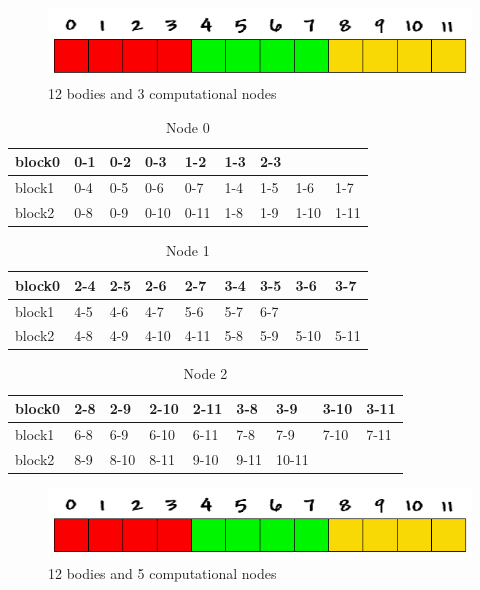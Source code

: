 \documentclass[a4paper]{article}
\begin{document}
\begin{figure}[ht]
  \centering\includegraphics[width=0.6\linewidth]{array_procs_3}
  \caption{12 bodies and 3 computational nodes}
  \label{fig:3nodes}
\end{figure}

\begin{table}[]
\centering
\caption{Node 0}
\label{my-label}
\begin{tabular}{l|llllllll}
block0 & 0-1 & 0-2 & 0-3  & 1-2  & 1-3 & 2-3 &      &      \\ \hline
block1 & 0-4 & 0-5 & 0-6  & 0-7  & 1-4 & 1-5 & 1-6  & 1-7  \\ \hline
block2 & 0-8 & 0-9 & 0-10 & 0-11 & 1-8 & 1-9 & 1-10 & 1-11
\end{tabular}
\end{table}

\begin{table}[]
\centering
\caption{Node 1}
\label{my-label}
\begin{tabular}{l|llllllll}
block0 & 2-4 & 2-5 & 2-6  & 2-7  & 3-4 & 3-5 & 3-6  & 3-7  \\ \hline
block1 & 4-5 & 4-6 & 4-7  & 5-6  & 5-7 & 6-7 &      &      \\ \hline
block2 & 4-8 & 4-9 & 4-10 & 4-11 & 5-8 & 5-9 & 5-10 & 5-11
\end{tabular}
\end{table}

\begin{table}[]
\centering
\caption{Node 2}
\label{my-label}
\begin{tabular}{l|llllllll}
block0 & 2-8 & 2-9  & 2-10 & 2-11 & 3-8  & 3-9   & 3-10 & 3-11 \\ \hline
block1 & 6-8 & 6-9  & 6-10 & 6-11 & 7-8  & 7-9   & 7-10 & 7-11 \\ \hline
block2 & 8-9 & 8-10 & 8-11 & 9-10 & 9-11 & 10-11 &      &     
\end{tabular}
\end{table}

\begin{figure}[ht]
  \centering\includegraphics[width=0.6\linewidth]{array_procs_3}
  \caption{12 bodies and 5 computational nodes}
  \label{fig:5nodes}
\end{figure}
\end{document}
